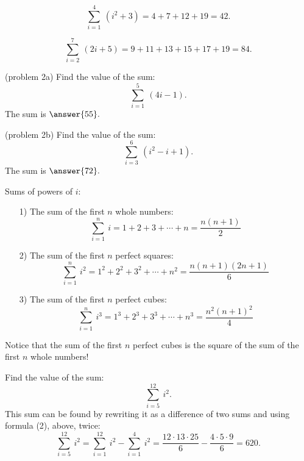 \documentclass[handout]{ximera}
\begin{document}
\begin{example}[example1]
\[\sum_{i = 1}^4 \ (i^2 + 3) = 4 + 7 + 12 + 19 = 42.\]
\end{example}

\begin{example}[example 2]
\[\sum_{i = 2}^7 \ (2i +5) = 9 + 11 + 13 + 15 + 17 + 19 = 84.\]
\end{example}

\begin{problem}(problem 2a)
Find the value of the sum:
\[\sum_{i = 1}^5 \ (4i -1).\]
The sum is $\answer{55}.$
\end{problem}

\begin{problem}(problem 2b)
Find the value of the sum:
\[\sum_{i = 3}^6 \ (i^2 - i + 1).\]
The sum is $\answer{72}.$
\end{problem}


\begin{theorem} Sums of powers of $i$:



\begin{enumerate}
\item[1)] The sum of the first $n$ whole numbers:
\[
\sum_{i = 1}^n \ i = 1 + 2 + 3+ \cdots + n = \frac{n(n+1)}{2}
\]
\item[2)] The sum of the first $n$ perfect squares:
\[
\sum_{i = 1}^n \ i^2 = 1^2 + 2^2 + 3^2 + \cdots + n^2 = \frac{n(n+1)(2n+1)}{6}
\]
\item[3)] The sum of the first $n$ perfect cubes:
\[
\sum_{i = 1}^n \ i^3 = 1^3 + 2^3+ 3^3 + \cdots + n^3 = \frac{n^2(n+1)^2}{4}
\]
\end{enumerate}
\end{theorem}

\begin{remark}
Notice that the sum of the first $n$ perfect cubes is the square of the sum of the 
first $n$ whole numbers!
\end{remark}

\begin{example}[example 3]
Find the value of the sum:
\[\sum_{i = 5}^{12} \ i^2.\]
This sum can be found by rewriting it as a difference of two sums and using formula (2), above, twice:
 \[\sum_{i = 5}^{12} \ i^2 = \sum_{i = 1}^{12}\ i^2 - \sum_{i = 1}^{4} \ i^2 = \frac{12\cdot 13\cdot 25}{6} - \frac{4\cdot 5\cdot 9}{6} = 620. \]
\end{example}
\end{document}
